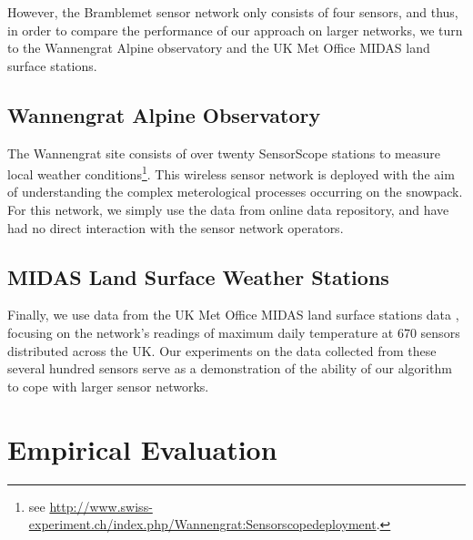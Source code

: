 \documentclass{acmtrans2m}
\begin{document}
However, the Bramblemet sensor network only consists of four sensors, and thus, in order to compare the performance of our approach on larger networks, we turn to the Wannengrat Alpine observatory and the UK Met Office MIDAS land surface stations.

\subsection{Wannengrat Alpine Observatory}

The Wannengrat site consists of over twenty SensorScope stations to measure local weather conditions\footnote{see \url{http://www.swiss-experiment.ch/index.php/Wannengrat:Sensorscopedeployment}.}. This wireless sensor network is deployed with the aim of understanding the complex meterological processes occurring on the snowpack. For this network, we simply use the data from online data repository, and have had no direct interaction with the sensor network operators.

\subsection{MIDAS Land Surface Weather Stations}

Finally, we use data from the UK Met Office MIDAS land surface stations data \cite{MIDASdata}, focusing on the network's readings of maximum daily temperature at 670 sensors distributed across the UK. Our experiments on the data collected from these several hundred sensors serve as a demonstration of the ability of our algorithm to cope with larger sensor networks. 

\section{Empirical Evaluation}\label{sec_evaluation}
\end{document}
